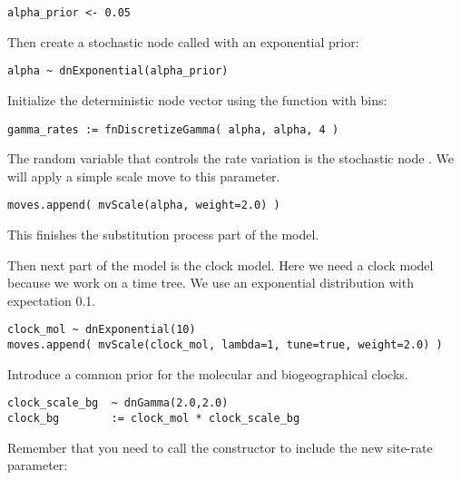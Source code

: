 {\tt\begin{snugshade*}
\begin{lstlisting}
alpha_prior <- 0.05                                                                             
\end{lstlisting}
\end{snugshade*}}
Then create a stochastic node called  with an exponential prior:
{\tt\begin{snugshade*}
\begin{lstlisting}
alpha ~ dnExponential(alpha_prior)
\end{lstlisting}
\end{snugshade*}}
Initialize the  deterministic node vector using the   function with  bins:
{\tt \begin{snugshade*}
\begin{lstlisting}
gamma_rates := fnDiscretizeGamma( alpha, alpha, 4 )
\end{lstlisting}
\end{snugshade*}}
The random variable that controls the rate variation is the stochastic node . 
We will apply a simple scale move to this parameter.
{\tt \begin{snugshade*}
\begin{lstlisting}
moves.append( mvScale(alpha, weight=2.0) )
\end{lstlisting}
\end{snugshade*}}
This finishes the substitution process part of the model.

Then next part of the model is the clock model. Here we need a clock model because we work on a time tree. We use an exponential distribution with expectation 0.1.
{\tt \begin{snugshade*}
\begin{lstlisting}
clock_mol ~ dnExponential(10)
moves.append( mvScale(clock_mol, lambda=1, tune=true, weight=2.0) )
\end{lstlisting}
\end{snugshade*}}

Introduce a common prior for the molecular and biogeographical clocks.
\begin{snugshade}
\begin{lstlisting}
clock_scale_bg  ~ dnGamma(2.0,2.0)
clock_bg        := clock_mol * clock_scale_bg
\end{lstlisting}
\end{snugshade}

Remember that you need to call the  constructor to include the new site-rate parameter:

